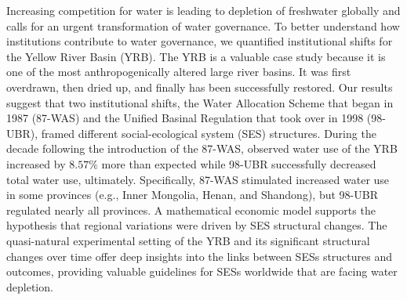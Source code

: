 Increasing competition for water is leading to depletion of freshwater globally and calls for an urgent transformation of water governance. To better understand how institutions contribute to water governance, we quantified institutional shifts for the Yellow River Basin (YRB).  The YRB is a valuable case study because it is one of the most anthropogenically altered large river basins. It was first overdrawn, then dried up, and finally has been successfully restored. Our results suggest that two institutional shifts, the Water Allocation Scheme that began in 1987 (87-WAS) and the Unified Basinal Regulation that took over in 1998 (98-UBR), framed different social-ecological system (SES) structures. During the decade following the introduction of the 87-WAS, observed water use of the YRB increased by $8.57\%$ more than expected while 98-UBR successfully decreased total water use, ultimately. Specifically, 87-WAS stimulated increased water use in some provinces (e.g., Inner Mongolia, Henan, and Shandong), but 98-UBR regulated nearly all provinces. A mathematical economic model supports the hypothesis that regional variations were driven by SES structural changes. The quasi-natural experimental setting of the YRB and its significant structural changes over time offer deep insights into the links between SESs structures and outcomes, providing valuable guidelines for SESs worldwide that are facing water depletion.
